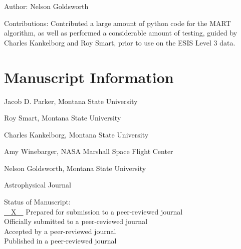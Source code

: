 Author: Nelson Goldsworth

\begin{singlespace}
	Contributions: Contributed a large amount of python code for the MART algorithm, as well as performed a considerable amount of testing, guided by Charles Kankelborg and Roy Smart, prior to use on the ESIS Level 3 data.
\end{singlespace}



\newpage

\section{Manuscript Information}

Jacob D. Parker, Montana State University

Roy Smart, Montana State University

Charles Kankelborg, Montana State University

Amy Winebarger, NASA Marshall Space Flight Center

Nelson Goldsworth, Montana State University


Astrophysical Journal

\begin{singlespace}
  Status of Manuscript: \\\indent %
  \underline{~~X~~} Prepared for submission to a peer-reviewed journal\\\indent
  \underline{\phantom{~~X~~}} Officially submitted to a peer-reviewed journal\\\indent
  \underline{\phantom{~~X~~}} Accepted by a peer-reviewed journal\\\indent
  \underline{\phantom{~~X~~}} Published in a peer-reviewed journal
\end{singlespace}
\newpage

